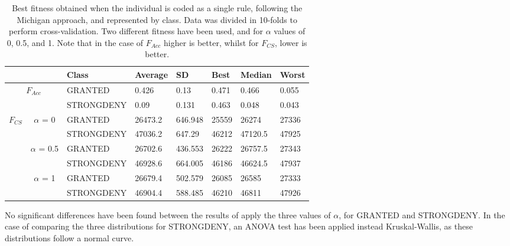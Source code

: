 \documentclass[a4paper,10pt,twocolumn,preprint,3p]{elsarticle}
\begin{document}
\begin{table*}
\begin{center}
\begin{tabular}{cc|l|l|l|l|l|l|}
\cline{3-8}
                                                &                                 & Class      & Average & SD & Best & Median & Worst \\ \hline
\multicolumn{2}{|c|}{\multirow{2}{*}{$F_{Acc}$}}                                  & GRANTED    & 0.426 & 0.13 & 0.471 & 0.466 & 0.055 \\ \cline{3-8} 
\multicolumn{2}{|c|}{}                                                            & STRONGDENY & 0.09 & 0.131 & 0.463 & 0.048 & 0.043 \\ \hline
\multicolumn{1}{|c|}{\multirow{6}{*}{$F_{CS}$}} & \multirow{2}{*}{$\alpha$ = 0}   & GRANTED    & 26473.2 & 646.948 & 25559 & 26274 & 27336 \\ \cline{3-8} 
\multicolumn{1}{|c|}{}                          &                                 & STRONGDENY & 47036.2 & 647.29 & 46212 & 47120.5 & 47925 \\ \cline{2-8} 
\multicolumn{1}{|c|}{}                          & \multirow{2}{*}{$\alpha$ = 0.5} & GRANTED    & 26702.6 & 436.553 & 26222 & 26757.5 & 27343 \\ \cline{3-8} 
\multicolumn{1}{|c|}{}                          &                                 & STRONGDENY & 46928.6 & 664.005 & 46186 & 46624.5 & 47937 \\ \cline{2-8} 
\multicolumn{1}{|c|}{}                          & \multirow{2}{*}{$\alpha$ = 1}   & GRANTED    & 26679.4 & 502.579 & 26085 & 26585 & 27333 \\ \cline{3-8} 
\multicolumn{1}{|c|}{}                          &                                 & STRONGDENY & 46904.4 & 588.485 & 46210 & 46811 & 47926 \\ \hline
\end{tabular}
\caption{Best fitness obtained when the individual is coded as a
  single rule, following the Michigan approach, and represented by
  class. Data was divided in 10-folds to perform cross-validation. Two
  different fitness have been used, and for $\alpha$ values of 0, 0.5,
  and 1. Note that in the case of $F_{Acc}$ higher is better, whilst
  for $F_{CS}$, lower is better.}
\label{tab:michigan}
\end{center}
\end{table*}

No significant differences have been found between the results of apply the
three values of $\alpha$, for GRANTED and STRONGDENY. %
In the case of comparing the three distributions %
for STRONGDENY, an ANOVA test has been applied instead Kruskal-Wallis,
as these distributions follow a normal curve. %
                                
\end{document}
